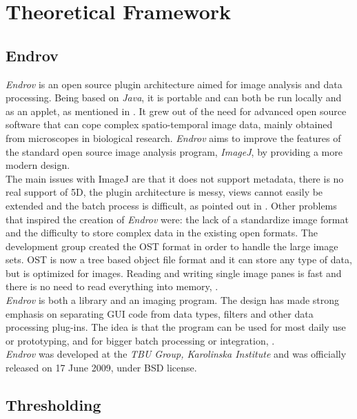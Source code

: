 \thispagestyle{empty}
\cleardoublepage
\chapter{Theoretical Framework}
\label{sec:dev}
\section{Endrov}
\label{sec:endrov}

\emph{Endrov} is an open source plugin architecture aimed for image analysis and data processing.
Being based on \emph{Java}, it is portable and can both be run locally and as an applet, as mentioned
in \cite{web:endrov}. It grew out of the need for advanced open source software 
that can cope complex spatio-temporal image data, mainly obtained from microscopes in 
biological research. \emph{Endrov} aims to improve the features of the standard 
open source image analysis program, \emph{ImageJ}, by providing a more modern design.\\
The main issues with ImageJ are that it does not support metadata, there is no real support of 5D, 
the plugin architecture is messy, views cannot easily be extended and the batch 
process is difficult, as pointed out in \cite{web:endrovhome}.
Other problems that inspired the creation of \emph{Endrov} were: the lack of a standardize
image format and the difficulty to store complex data in the existing open formats.
The development group created the OST format in order
to handle the large image sets. OST is now a tree based object file format and it can store any 
type of data, but is optimized for images. 
Reading and writing single image panes is fast 
and there is no need to read everything into memory, \cite{web:endrovhome}.\\

\emph{Endrov} is both a library and an imaging program. The design has made strong emphasis on 
separating GUI code from data types, filters and other data processing plug-ins. 
The idea is that the program can be used for most daily use or prototyping, and for 
bigger batch processing or integration, \cite{web:endrov}.\\

\emph{Endrov} was developed at the \emph{TBU Group, Karolinska Institute} and was officially released 
on 17 June 2009, under BSD license.



\section{Thresholding}
\label{sec:thresholding}

